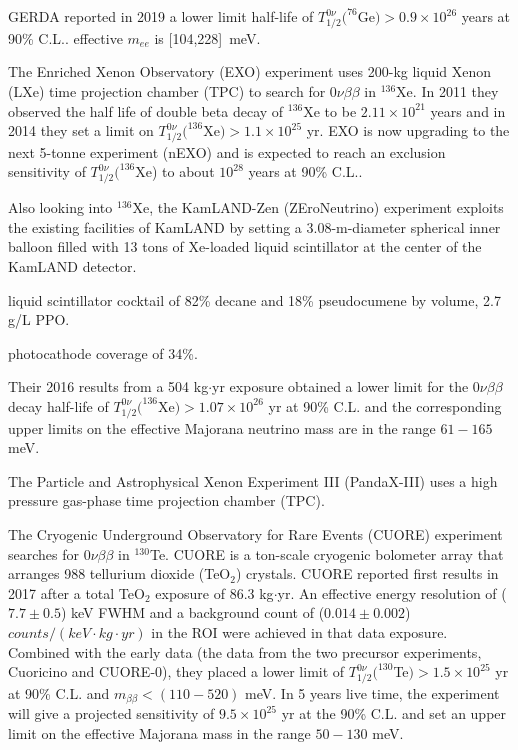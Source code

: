 GERDA reported in 2019 a lower limit half-life of $T^{0\nu}_{1/2}(^{76}$Ge$)>0.9\times 10^{26}$ years at 90\% C.L.\cite{agostini2019probing}. effective $m_{ee}$ is [104,228]~meV.


The Enriched Xenon Observatory (EXO) experiment uses 200-kg liquid Xenon (LXe) time projection chamber (TPC) to search for $0\nu\beta\beta$ in $^{136}$Xe. In 2011 they observed the half life of double beta decay of $^{136}$Xe to be $2.11\times 10^{21}$ years and in 2014 they set a limit on $T^{0\nu}_{1/2}(^{136}$Xe$)>1.1\times 10^{25}$ yr\cite{albert2014search}. EXO is now upgrading to the next 5-tonne experiment (nEXO) and is expected to reach an exclusion sensitivity of $T^{0\nu}_{1/2}(^{136}$Xe) to about $10^{28}$ years at 90\% C.L.\cite{albert2018sensitivity}.

Also looking into $^{136}$Xe, the KamLAND-Zen (ZEroNeutrino) experiment exploits the existing facilities of KamLAND by setting a 3.08-m-diameter spherical inner balloon filled with 13 tons of Xe-loaded liquid scintillator at the center of the KamLAND detector.

liquid scintillator cocktail of 82\% decane and 18\% pseudocumene by volume, 2.7 g/L PPO.

photocathode coverage of 34\%.

Their 2016 results from a 504 kg$\cdot$yr exposure obtained a lower limit for the $0\nu\beta\beta$ decay half-life of $T^{0\nu}_{1/2}(^{136}$Xe$)>1.07\times 10^{26}$ yr at 90\% C.L. and the corresponding upper limits on the effective Majorana neutrino mass are in the range $61-165$ meV\cite{gando2016search}.

The Particle and Astrophysical Xenon Experiment III (PandaX-III) uses a high pressure gas-phase time projection chamber (TPC).

The Cryogenic Underground Observatory for Rare Events (CUORE) experiment searches for $0\nu\beta\beta$ in $^{130}$Te. CUORE is a ton-scale cryogenic bolometer array that arranges 988 tellurium dioxide (TeO$_2$) crystals. CUORE reported first results in 2017 after a total TeO$_2$ exposure of 86.3 kg$\cdot$yr. An effective energy resolution of ($7.7\pm 0.5$) keV FWHM and a background count of ($0.014\pm0.002$) $counts/(keV\cdot kg\cdot yr)$ in the ROI were achieved in that data exposure. Combined with the early data (the data from the two precursor experiments, Cuoricino and CUORE-0), they placed a lower limit of $T^{0\nu}_{1/2}(^{130}$Te$)>1.5\times 10^{25}$ yr at 90\% C.L. and $m_{\beta\beta}<(110-520)$ meV\cite{alduino2018first}. In 5 years live time, the experiment will give a projected sensitivity of $9.5\times 10^{25}$ yr at the 90\% C.L. and set an upper limit on the effective Majorana mass in the range $50-130$ meV\cite{piperno2015dark}.

